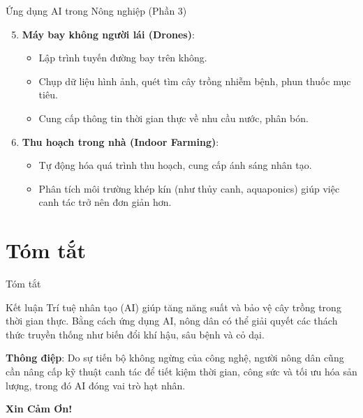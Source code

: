 \documentclass[aspectratio=169]{beamer}
\begin{document}
\begin{frame}{Ứng dụng AI trong Nông nghiệp (Phần 3)}
    \begin{enumerate}
        \setcounter{enumi}{4}
        \item \textbf{Máy bay không người lái (Drones)}:
        \begin{itemize}
            \item Lập trình tuyến đường bay trên không.
            \item Chụp dữ liệu hình ảnh, quét tìm cây trồng nhiễm bệnh, phun thuốc mục tiêu.
            \item Cung cấp thông tin thời gian thực về nhu cầu nước, phân bón.
        \end{itemize}
        \vspace{0.3cm}
        \item \textbf{Thu hoạch trong nhà (Indoor Farming)}:
        \begin{itemize}
            \item Tự động hóa quá trình thu hoạch, cung cấp ánh sáng nhân tạo.
            \item Phân tích môi trường khép kín (như thủy canh, aquaponics) giúp việc canh tác trở nên đơn giản hơn.
        \end{itemize}
    \end{enumerate}
\end{frame}

\section{Tóm tắt}
\begin{frame}{Tóm tắt}
    \begin{block}{Kết luận}
        Trí tuệ nhân tạo (AI) giúp tăng năng suất và bảo vệ cây trồng trong thời gian thực. Bằng cách ứng dụng AI, nông dân có thể giải quyết các thách thức truyền thống như biến đổi khí hậu, sâu bệnh và cỏ dại.
    \end{block}
    
    \vspace{0.5cm}
    \textbf{Thông điệp}:
    Do sự tiến bộ không ngừng của công nghệ, người nông dân cũng cần nâng cấp kỹ thuật canh tác để tiết kiệm thời gian, công sức và tối ưu hóa sản lượng, trong đó AI đóng vai trò hạt nhân.
\end{frame}

\begin{frame}
    \centering \Huge \textbf{Xin Cảm Ơn!}
\end{frame}
\end{document}
